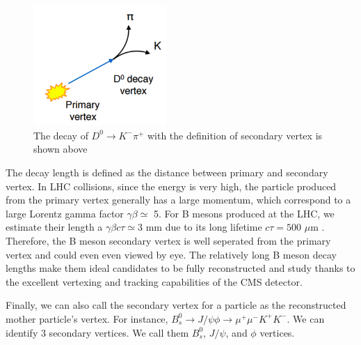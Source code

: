 \begin{figure}[hbtp]
\begin{center}
\includegraphics[width=0.45\textwidth]{Figures/Chapter3/D0Seconary.png}
\caption{The decay of $D^0 \rightarrow K^- \pi^+$ with the definition of secondary vertex is shown above}
\label{D0Vtx}
\end{center}
\end{figure} 

The decay length is defined as the distance between primary and secondary vertex. In LHC collisions, since the energy is very high, the particle produced from the primary vertex generally has a large momentum, which correspond to a large Lorentz gamma factor $\gamma \beta \simeq$ 5. For B mesons produced at the LHC, we estimate their length a $\gamma \beta c \tau \simeq 3$ mm due to its long lifetime $c \tau = 500$ $\mu$m \cite{AlphaTheoEx}. Therefore, the B meson secondary vertex is well seperated from the primary vertex and could even even viewed by eye. The relatively long B meson decay lengths make them ideal candidates to be fully reconstructed and study thanks to the excellent vertexing and tracking capabilities of the CMS detector.

Finally, we can also call the secondary vertex for a particle as the reconstructed mother particle's vertex. For instance, $B^0_s \rightarrow J/\psi \phi \rightarrow \mu^+\mu^- K^+K^-$. We can identify 3 secondary vertices. We call them $B^0_s$, $J/\psi$, and $\phi$ vertices. 

